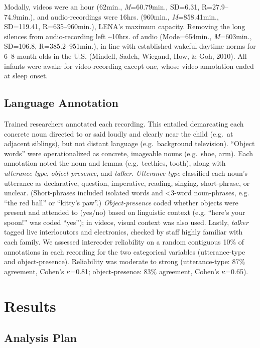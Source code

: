 \documentclass[man]{apa6}
\theoremstyle{definition}
\theoremstyle{definition}
\theoremstyle{definition}
\theoremstyle{remark}
\begin{document}
Modally, videos were an hour (62min., \emph{M}=60.79min., SD=6.31,
R=27.9--74.9min.), and audio-recordings were 16hrs. (960min.,
\emph{M}=858.41min., SD=119.41, R=635--960min.), LENA's maximum
capacity. Removing the long silences from audio-recording left
\textasciitilde{}10hrs. of audio (Mode=654min., \emph{M}=603min.,
SD=106.8, R=385.2--951min.), in line with established wakeful daytime
norms for 6--8-month-olds in the U.S. (Mindell, Sadeh, Wiegand, How, \&
Goh, 2010). All infants were awake for video-recording except one, whose
video annotation ended at sleep onset.

\hypertarget{language-annotation}{%
\subsection{Language Annotation}\label{language-annotation}}

Trained researchers annotated each recording. This entailed demarcating
each concrete noun directed to or said loudly and clearly near the child
(e.g.~at adjacent siblings), but not distant language (e.g.~background
television). \enquote{Object words} were operationalized as concrete,
imageable nouns (e.g.~shoe, arm). Each annotation noted the noun and
lemma (e.g.~teethies, tooth), along with \emph{utterance-type},
\emph{object-presence}, and \emph{talker}. \emph{Utterance-type}
classified each noun's utterance as declarative, question, imperative,
reading, singing, short-phrase, or unclear. (Short-phrases included
isolated words and \textless{}3-word noun-phrases, e.g. \enquote{the red
ball} or \enquote{kitty's paw}.) \emph{Object-presence} coded whether
objects were present and attended to (yes/no) based on linguistic
context (e.g. \enquote{here's your spoon!} was coded \enquote{yes}); in
videos, visual context was also used. Lastly, \emph{talker} tagged live
interlocutors and electronics, checked by staff highly familiar with
each family. We assessed intercoder reliability on a random contiguous
10\% of annotations in each recording for the two categorical variables
(utterance-type and object-presence). Reliability was moderate to strong
(utterance-type: 87\% agreement, Cohen's \(\kappa\)=0.81;
object-presence: 83\% agreement, Cohen's \(\kappa\)=0.65).

\hypertarget{results}{%
\section{Results}\label{results}}

\hypertarget{analysis-plan}{%
\subsection{Analysis Plan}\label{analysis-plan}}
\end{document}
